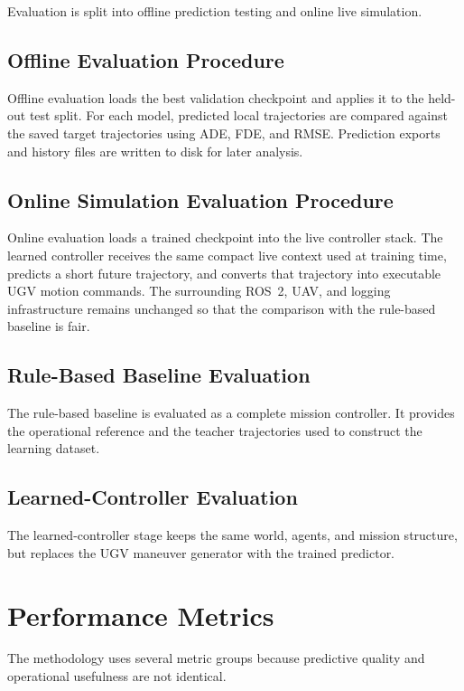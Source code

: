 Evaluation is split into offline prediction testing and online live simulation.

\subsection{Offline Evaluation Procedure}

Offline evaluation loads the best validation checkpoint and applies it to the held-out test split. For each model, predicted local trajectories are compared against the saved target trajectories using ADE, FDE, and RMSE. Prediction exports and history files are written to disk for later analysis.

\subsection{Online Simulation Evaluation Procedure}

Online evaluation loads a trained checkpoint into the live controller stack. The learned controller receives the same compact live context used at training time, predicts a short future trajectory, and converts that trajectory into executable UGV motion commands. The surrounding ROS~2, UAV, and logging infrastructure remains unchanged so that the comparison with the rule-based baseline is fair.

\subsection{Rule-Based Baseline Evaluation}

The rule-based baseline is evaluated as a complete mission controller. It provides the operational reference and the teacher trajectories used to construct the learning dataset.

\subsection{Learned-Controller Evaluation}

The learned-controller stage keeps the same world, agents, and mission structure, but replaces the UGV maneuver generator with the trained predictor.

\section{Performance Metrics}

The methodology uses several metric groups because predictive quality and operational usefulness are not identical.

